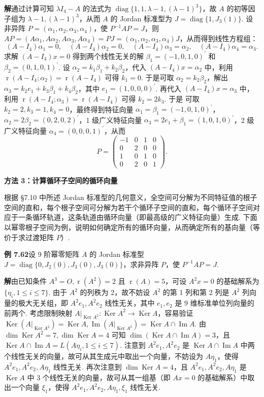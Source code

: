 \documentclass[UTF8, 12pt, fontset=fandol, oneside]{ctexart}
\begin{document}
\noindent\textbf{解}\quad 通过计算可知 $\lambda I_4-A$ 的法式为 $\operatorname{diag}\{1,1,\lambda-1,(\lambda-1)^3\}$，故 $A$ 的初等因子组为 $\lambda-1,(\lambda-1)^3$，从而 $A$ 的 Jordan 标准型为 $J=\operatorname{diag}\{1,J_3(1)\}$. 设非异阵 $P=(\alpha_1,\alpha_2,\alpha_3,\alpha_4)$，使 $P^{-1}AP=J$，则 $AP=(A\alpha_1,A\alpha_2,A\alpha_3,A\alpha_4)=PJ=(\alpha_1,\alpha_2,\alpha_3,\alpha_4)J$，从而得到线性方程组：
\[
(A-I_4)\alpha_1=0,\quad (A-I_4)\alpha_2=0,\quad (A-I_4)\alpha_3=\alpha_2,\quad (A-I_4)\alpha_4=\alpha_3.
\]
求解 $(A-I_4)x=0$ 得到两个线性无关的解 $\beta_1=(-1,0,1,0)^{\prime}$ 和 $\beta_2=(0,1,0,1)^{\prime}$. 设 $\alpha_2=k_1\beta_1+k_2\beta_2$，代入 $(A-I_4)x=\alpha_2$ 中，利用 $\operatorname{r}(A-I_4;\alpha_2)=\operatorname{r}(A-I_4)$ 可得 $k_1=0$. 于是可取 $\alpha_2=k_2\beta_2$，解出 $\alpha_3=k_2e_1+k_3\beta_1+k_4\beta_2$，其中 $e_1=(1,0,0,0)^{\prime}$. 再代入 $(A-I_4)x=\alpha_3$ 中，利用 $\operatorname{r}(A-I_4;\alpha_3)=\operatorname{r}(A-I_4)$ 可得 $k_2=2k_3$. 于是
可取 $k_2=2,k_3=1,k_4=0$，最终得到特征向量 $\alpha_1=\beta_1=(-1,0,1,0)^{\prime}$，$\alpha_2=2\beta_2=(0,2,0,2)^{\prime}$，1 级广义特征向量 $\alpha_3=2e_1+\beta_1=(1,0,1,0)^{\prime}$，2 级广义特征向量 $\alpha_4=(0,0,0,1)^{\prime}$，从而
\[
P=\left(\begin{array}{rrrr}
-1&0&1&0\\
0&2&0&0\\
1&0&1&0\\
0&2&0&1
\end{array}\right).
\]

\noindent\textbf{方法 3：计算循环子空间的循环向量}

根据 §7.10 中所述 Jordan 标准型的几何意义，全空间可分解为不同特征值的根子空间的直和，每个根子空间可分解为若干个循环子空间的直和，每个循环子空间对应于一条循环轨道，这条轨道由循环向量（即最高级的广义特征向量）生成. 下面以幂零根子空间为例，说明如何确定所有的循环向量，从而确定所有的基向量（等价于求过渡矩阵 $P$）.

\noindent\textbf{例 7.62}\quad 设 9 阶幂零矩阵 $A$ 的 Jordan 标准型 $J=\operatorname{diag}\{0,J_2(0),J_3(0),J_3(0)\}$，求非异阵 $P$，使 $P^{-1}AP=J$.

\noindent\textbf{解}\quad 由已知条件 $A^3=O,\operatorname{r}(A^2)=2$ 且 $\operatorname{r}(A)=5$，可设 $A^2x=0$ 的基础解系为 $\{\eta_i,1\le i\le 7\}$. 由于 $A^2$ 的列秩为 2，故不妨设 $A^2$ 的第 1 列和第 2 列是 $A^2$ 列向量的极大无关组，即 $A^2e_1,A^2e_2$ 线性无关，其中 $e_1,e_2$ 是 9 维标准单位列向量的前两个. 考虑限制映射 $A|_{\operatorname{Ker}A^2}:\operatorname{Ker}A^2\to\operatorname{Ker}A$，容易验证 $\operatorname{Ker}(A|_{\operatorname{Ker}A^2})=\operatorname{Ker}A,\operatorname{Im}(A|_{\operatorname{Ker}A^2})=\operatorname{Ker}A\cap\operatorname{Im}A$. 由 $\dim\operatorname{Ker}A^2=7,\dim\operatorname{Ker}A=4$ 可知 $\dim(\operatorname{Ker}A\cap\operatorname{Im}A)=3$，且 $\operatorname{Ker}A\cap\operatorname{Im}A=L(A\eta_i,1\le i\le 7)$. 注意到 $A^2e_1,A^2e_2$ 是 $\operatorname{Ker}A\cap\operatorname{Im}A$ 中两个线性无关的向量，故可从其生成元中取出一个向量，不妨设为 $A\eta_1$，使得 $A^2e_1,A^2e_2,A\eta_1$ 线性无关. 再次注意到 $\dim\operatorname{Ker}A=4$，且 $A^2e_1,A^2e_2,A\eta_1$ 是 $\operatorname{Ker}A$ 中 3 个线性无关的向量，故可从其一组基（即 $Ax=0$ 的基础解系）中取出一个向量 $\xi_1$，使得 $A^2e_1,A^2e_2,A\eta_1,\xi_1$ 线性无关.
\end{document}
